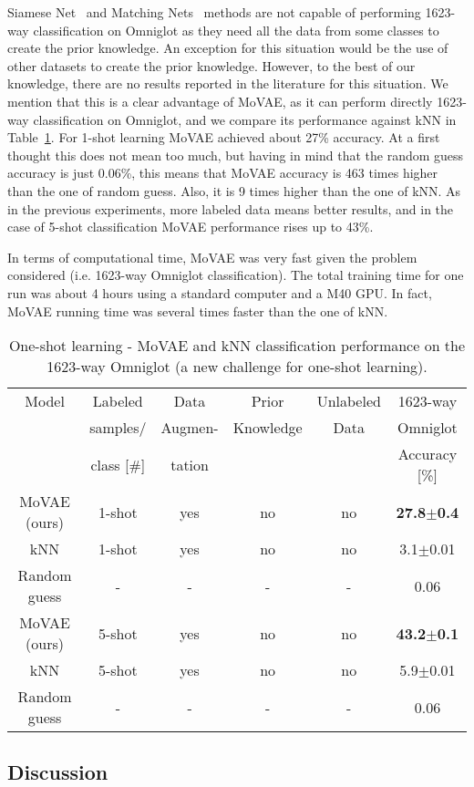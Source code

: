 \documentclass[sigconf,authorversion=true]{aamas}  %
\begin{document}
Siamese Net~\cite{Koch2015SiameseNN} and Matching Nets~\cite{VinyalsBLKW16} methods are not capable of performing 1623-way classification on Omniglot as they need all the data from some classes to create the prior knowledge. An exception for this situation would be the use of other datasets to create the prior knowledge. However, to the best of our knowledge, there are no results reported in the literature for this situation. We mention that this is a clear advantage of MoVAE, as it can perform directly 1623-way classification on Omniglot, and we compare its performance against kNN in Table~\ref{tab:oneshotomniglot1623}. For 1-shot learning MoVAE achieved about 27\% accuracy. At a first thought this does not mean too much, but having in mind that the random guess accuracy is just 0.06\%, this means that MoVAE accuracy is 463 times higher than the one of random guess. Also, it is 9 times higher than the one of kNN. As in the previous experiments, more labeled data means better results, and in the case of 5-shot classification MoVAE performance rises up to 43\%.

In terms of computational time, MoVAE was very fast given the problem considered (i.e. 1623-way Omniglot classification). The total training time for one run was about 4 hours using a standard computer and a M40 GPU. In fact, MoVAE running time was several times faster than the one of kNN.

\begin{table}[t!]
\caption{One-shot learning - MoVAE and kNN classification performance on the 1623-way Omniglot (a new challenge for one-shot learning).}
\footnotesize
\tabcolsep=0.06cm
\begin{tabular}{|c|c|c|c|c|c|}
\hline
Model&Labeled&Data&Prior&Unlabeled&1623-way\\
&samples/&Augmen-&Knowledge&Data&Omniglot\\
&class [\#]&tation&&&Accuracy [\%]\\
\hline
\hline
MoVAE (ours)&1-shot&yes&no&no&\textbf{27.8$\pm$0.4}\\
kNN&1-shot&yes&no&no&3.1$\pm$0.01\\
Random guess&-&-&-&-&0.06\\
\hline
MoVAE (ours)&5-shot&yes&no&no&\textbf{43.2$\pm$0.1}\\
kNN&5-shot&yes&no&no&5.9$\pm$0.01\\
Random guess&-&-&-&-&0.06\\

\hline
\end{tabular}
\label{tab:oneshotomniglot1623}
\vspace*{-1em}
\end{table}\subsection{Discussion}
\end{document}

